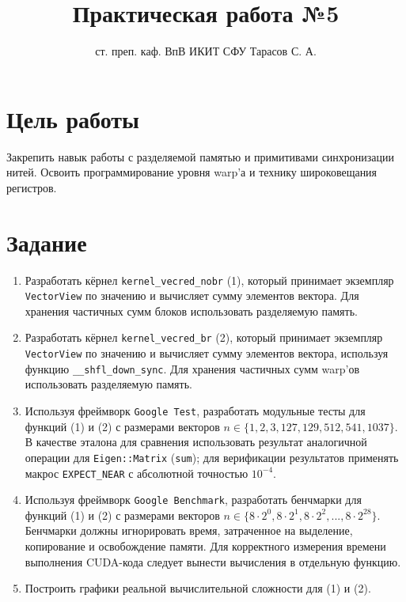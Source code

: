 \documentclass[12pt]{article}
\title{Практическая работа №5}
\author{ст. преп. каф. ВпВ ИКИТ СФУ Тарасов С. А.}
\date{}
\begin{document}
\maketitle

\section*{Цель работы}
Закрепить навык работы с разделяемой памятью и примитивами синхронизации нитей. Освоить программирование уровня warp'а и технику широковещания регистров.

\section*{Задание}
\begin{enumerate}
    \item Разработать кёрнел \texttt{kernel\_vecred\_nobr} (1), который принимает экземпляр \texttt{VectorView} по значению и вычисляет сумму элементов вектора. Для хранения частичных сумм блоков использовать разделяемую память.

    \item Разработать кёрнел \texttt{kernel\_vecred\_br} (2), который принимает экземпляр \texttt{VectorView} по значению и вычисляет сумму элементов вектора, используя функцию \texttt{\_\_shfl\_down\_sync}. Для хранения частичных сумм warp'ов использовать разделяемую память.

    \item Используя фреймворк \texttt{Google Test}, разработать модульные тесты для функций (1) и (2) с размерами векторов $n \in \{1, 2, 3, 127, 129, 512, 541, 1037\}$. В качестве эталона для сравнения использовать результат аналогичной операции для \texttt{Eigen::Matrix} (\texttt{sum}); для верификации результатов применять макрос \texttt{EXPECT\_NEAR} с абсолютной точностью $10^{-4}$.

    \item Используя фреймворк \texttt{Google Benchmark}, разработать бенчмарки  для функций (1) и (2) с размерами векторов $n \in \{8 \cdot 2^0, 8 \cdot 2^1, 8 \cdot 2^2, ..., 8 \cdot 2^{28}\}$. Бенчмарки должны игнорировать время, затраченное на выделение, копирование и освобождение памяти. Для корректного измерения времени выполнения CUDA-кода следует вынести вычисления в отдельную функцию.

    \item Построить графики реальной вычислительной сложности для (1) и (2).


\end{enumerate}
\end{document}

